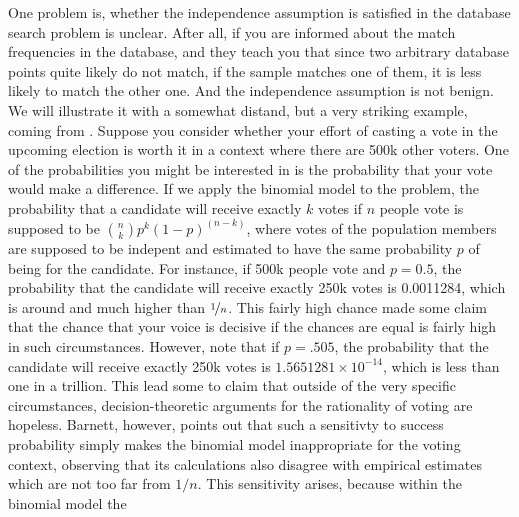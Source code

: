 \documentclass[10pt,dvipsnames,enabledeprecatedfontcommands]{scrartcl}
\begin{document}
 One
problem is, whether the independence assumption is satisfied in the
database search problem is unclear. After all, if you are informed about
the match frequencies in the database, and they teach you that since two
arbitrary database points quite likely do not match, if the sample
matches one of them, it is less likely to match the other one. And the
independence assumption is not benign. We will illustrate it with a
somewhat distand, but a very striking example, coming from
. Suppose you consider whether your effort of casting
a vote in the upcoming election is worth it in a context where there are
500k other voters. One of the probabilities you might be interested in
is the probability that your vote would make a difference. If we apply
the binomial model to the problem, the probability that a candidate will
receive exactly \(k\) votes if \(n\) people vote is supposed to be
\({n \choose k} p^{k} (1-p)^{(n-k)}\), where votes of the population
members are supposed to be indepent and estimated to have the same
probability \(p\) of being for the candidate. For instance, if 500k
people vote and \(p= 0.5\), the probability that the candidate will
receive exactly 250k votes is 0.0011284, which is around
 and much higher than \(\nicefrac{1}{n}\). This fairly
high chance made some claim that the chance that your voice is decisive
if the chances are equal is fairly high in such circumstances. However,
note that if \(p=.505\), the probability that the candidate will receive
exactly 250k votes is \ensuremath{1.5651281\times 10^{-14}}, which is
less than one in a trillion. This lead some
 to claim that
outside of the very specific circumstances, decision-theoretic arguments
for the rationality of voting are hopeless. Barnett, 
however, points out that such a sensitivty to success probability simply
makes the binomial model inappropriate for the voting context, observing
that its calculations also disagree with empirical estimates which are
not too far from \(1/n\).
 This sensitivity arises, because within the binomial model the
\end{document}
